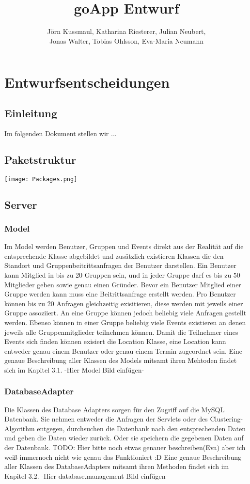 \documentclass{scrartcl}
\title{goApp Entwurf}
\author{Jörn Kussmaul, Katharina Riesterer, Julian Neubert,\\ Jonas Walter, Tobias Ohlsson, Eva-Maria Neumann}
\begin{document}
	\maketitle
	\newpage
	\tableofcontents
	\newpage

	\section{Entwurfsentscheidungen}
	\subsection{Einleitung}
	Im folgenden Dokument stellen wir ...
	\subsection{Paketstruktur}
	 \texttt{[image: Packages.png]}
	\subsection{Server}
	\subsubsection{Model}
Im Model werden Benutzer, Gruppen und Events direkt aus der Realität auf die entsprechende Klasse abgebildet und zusätzlich existieren Klassen die den Standort und Gruppenbeitrittsanfragen der Benutzer darstellen.
Ein Benutzer kann Mitglied in bis zu 20 Gruppen sein, und in jeder Gruppe darf es bis zu 50 Mitglieder geben sowie genau einen Gründer. Bevor ein Benutzer Mitglied einer Gruppe werden kann muss eine Beitrittsanfrage erstellt werden.
Pro Benutzer können bis zu 20 Anfragen gleichzeitig exisitieren, diese werden mit jeweils einer Gruppe assoziiert.
An eine Gruppe können jedoch beliebig viele Anfragen gestellt werden.
Ebenso können in einer Gruppe beliebig viele Events existieren an denen jeweils alle Gruppenmitglieder teilnehmen können.
Damit die Teilnehmer eines Events sich finden können exisiert die Location Klasse, eine Location kann entweder genau einem Benutzer oder genau einem Termin zugeordnet sein. 
Eine genaue Beschreibung aller Klassen des Models mitsamt ihren Mehtoden findet sich im Kapitel 3.1.
-Hier Model Bild einfügen-

	\subsubsection{DatabaseAdapter}
	Die Klassen des Database Adapters sorgen für den Zugriff auf die MySQL Datenbank.
Sie nehmen entweder die Anfragen der Servlets oder des Clustering-Algorithm entgegen, durchsuchen die Datenbank nach den entsprechenden Daten und geben die Daten wieder zurück.  
Oder sie speichern die gegebenen Daten auf der Datenbank.
TODO: Hier bitte noch etwas genauer beschreiben(Eva) aber ich weiß immernoch nicht wie genau das Funktioniert :D
Eine genaue Beschreibung aller Klassen des DatabaseAdapters mitsamt ihren Methoden findet sich im Kapitel 3.2.
-Hier database.management Bild einfügen-
\end{document}
